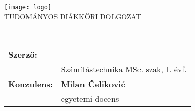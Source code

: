 \makeatletter
\renewcommand\maketitle{
{
\begin{center}
\texttt{[image: logo]} \\[4ex]
\Large \uppercase{Tudományos diákköri dolgozat}
\end{center}
\vspace{1cm}
\begin{center}
{\Huge \bfseries \uppercase{\@title} }\\
\vspace{2cm}
\newcolumntype{R}{>{\raggedleft\arraybackslash}X}%
\centering
\large{
\begin{tabularx}{\textwidth}{R X}
\textbf{Szerző:} &  \textbf{\@author} \\
         & Számítástechnika MSc. szak, I. évf. \\[4ex]
\textbf{Konzulens:} & \textbf{Milan Čeliković} \\
& egyetemi docens
\end{tabularx}
}
\end{center}}
} %

\begin{titlepage}
\thispagestyle{fancy}
\fancyhf{}
\renewcommand{\headrulewidth}{0pt}
\maketitle
\end{titlepage}
